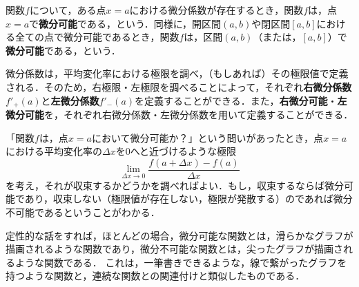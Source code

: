 \begin{definition}[微分可能]
	関数$f$について，ある点$x = a$における微分係数が存在するとき，関数$f$は，点$x = a$で\textbf{微分可能}である，という．同様に，開区間$(a, b)$や閉区間$[a ,b]$における全ての点で微分可能であるとき，関数$f$は，区間$(a, b)$（または，$[a, b]$）で\textbf{微分可能}である，という．
\end{definition}
\begin{rem*}
	微分係数は，平均変化率における極限を調べ，（もしあれば）その極限値で定義される．そのため，右極限・左極限を調べることによって，それぞれ\textbf{右微分係数}$f'_{+}(a)$と\textbf{左微分係数}$f'_{-}(a)$を定義することができる．また，\textbf{右微分可能}・\textbf{左微分可能}を，それぞれ右微分係数・左微分係数を用いて定義することができる．
\end{rem*}
\begin{rem*}
	「関数$f$は，点$x = a$において微分可能か？」という問いがあったとき，点$x = a$における平均変化率の$\Delta x$を$0$へと近づけるような極限
	\[
		\lim\limits_{\Delta x \to 0}\frac{f(a+\Delta x) - f(a)}{\Delta x}
	\]
	を考え，それが収束するかどうかを調べればよい．もし，収束するならば微分可能であり，収束しない（極限値が存在しない，極限が発散する）のであれば微分不可能であるということがわかる．
\end{rem*}
\begin{rem*}
	定性的な話をすれば，ほとんどの場合，微分可能な関数とは，滑らかなグラフが描画されるような関数であり，微分不可能な関数とは，尖ったグラフが描画されるような関数である．
	これは，一筆書きできるような，線で繋がったグラフを持つような関数と，連続な関数との関連付けと類似したものである．
\end{rem*}
\newpage

